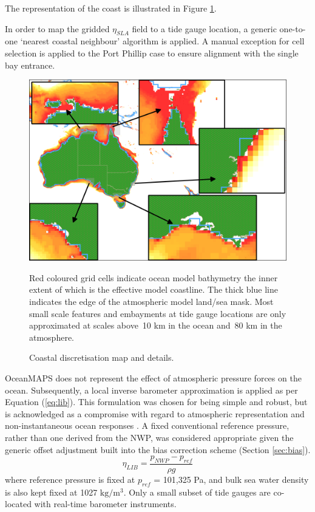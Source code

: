 The representation of the coast is illustrated in Figure \ref{fig:map_masks}.

In order to map the gridded $\eta_{SLA}$ field to a tide gauge location, a generic one-to-one `nearest coastal neighbour' algorithm is applied.
A manual exception for cell selection is applied to the Port Phillip case to ensure alignment with the single bay entrance. 
\begin{figure}[!hbt] \centering
    \includegraphics[width=1.0\textwidth]{figures/maps/omaps_masks.png}
    \caption{Coastal discretisation map and details.}
    {Red coloured grid cells indicate ocean model bathymetry the inner extent of which is the effective model coastline.  The thick blue line indicates the edge of the atmospheric model land/sea mask.  Most small scale features and embayments at tide gauge locations are only approximated at scales above~10 km in the ocean and~80 km in the atmosphere. }
    \label{fig:map_masks}
\end{figure}  


OceanMAPS does not represent the effect of atmospheric pressure forces on the ocean.
Subsequently, a local inverse barometer approximation is applied as per Equation (\ref{eq:lib}).
This formulation was chosen for being simple and robust, but is acknowledged as a compromise with regard to atmospheric representation and non-instantaneous ocean responses \citep{Mathers:2004bk}.
A fixed conventional reference pressure, rather than one derived from the NWP, was considered appropriate given the generic offset adjustment built into the bias correction scheme (Section \ref{sec:bias}).  
\begin{equation}
  \eta_{LIB} = \frac{ p_{NWP} - p_{ref} }{ \rho g }
  \label{eq:lib}
\end{equation}
where reference pressure is fixed at $p_{ref}$ = 101,325 Pa, and bulk sea water density is also kept fixed at 1027 $\text{kg}/\text{m}^3$.
Only a small subset of tide gauges are co-located with real-time barometer instruments.


